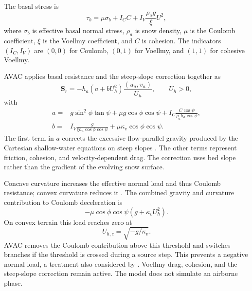 \documentclass[11pt,a4paper]{article}
\begin{document}
The basal stress is
\begin{equation}
  \tau_b=\mu\sigma_b+I_C C+I_V\frac{\rho_a g}{\xi}U^2,
  \label{eq:avac-rheology}
\end{equation}
where $\sigma_b$ is effective basal normal stress, $\rho_a$ is snow density,
$\mu$ is the Coulomb coefficient, $\xi$ is the Voellmy coefficient, and $C$
is cohesion. The indicators $(I_C,I_V)$ are $(0,0)$ for Coulomb, $(0,1)$
for Voellmy, and $(1,1)$ for cohesive Voellmy.

AVAC applies basal resistance and the steep-slope correction together as
\begin{equation}
  \boldsymbol{S}_r=-h_a(a+bU_h^2)\frac{(u_a,v_a)}{U_h},\qquad U_h>0,
  \label{eq:avac-friction-vector}
\end{equation}
with
\begin{equation}
  \begin{split}
  a={}&g\sin^2\phi\tan\psi+\mu g\cos\phi\cos\psi
       +I_C\frac{C\cos\psi}{\rho_a h_a\cos\phi},\\
  b={}&I_V\frac{g}{\xi h_a\cos\phi\cos\psi}
       +\mu\kappa_v\cos\phi\cos\psi.
  \end{split}
  \label{eq:avac-source-coefficients}
\end{equation}
The first term in $a$ corrects the excessive flow-parallel gravity produced
by the Cartesian shallow-water equations on steep slopes
\citep{HergartenRobl2015}. The other terms represent friction, cohesion, and
velocity-dependent drag. The correction uses bed slope rather than the
gradient of the evolving snow surface.

Concave curvature increases the effective normal load and thus Coulomb
resistance; convex curvature reduces it \citep{FischerEtAl2012}. The combined
gravity and curvature contribution to Coulomb deceleration is
\begin{equation}
  -\mu\cos\phi\cos\psi\left(g+\kappa_v U_h^2\right).
  \label{eq:avac-curvature-normal-load}
\end{equation}
On convex terrain this load reaches zero at
\begin{equation}
  U_{h,c}=\sqrt{-g/\kappa_v}.
  \label{eq:avac-contact-speed}
\end{equation}
AVAC removes the Coulomb contribution above this threshold and switches
branches if the threshold is crossed during a source step. This prevents a
negative normal load, a treatment also considered by \citet{WirbelEtAl2026}.
Voellmy drag, cohesion, and the steep-slope correction remain active. The
model does not simulate an airborne phase.
\end{document}
